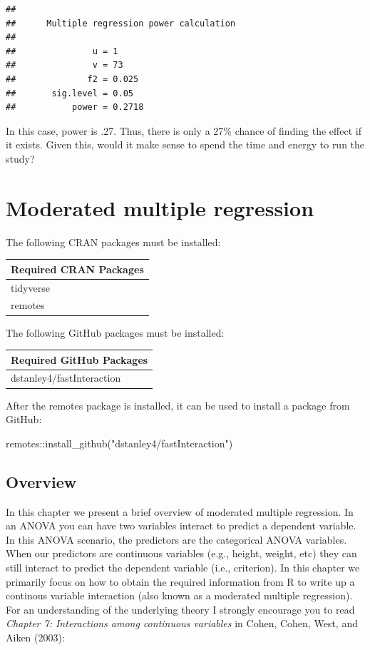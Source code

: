 \documentclass[
]{krantz}
\makeatletter
\newenvironment{Shaded}{\begin{snugshade}}{\end{snugshade}}
\newcommand{\FunctionTok}[1]{\textcolor[rgb]{0,0,0}{#1}}
\newcommand{\NormalTok}[1]{#1}
\newcommand{\SpecialCharTok}[1]{\textcolor[rgb]{0,0,0}{#1}}
\newcommand{\StringTok}[1]{\textcolor[rgb]{0.5,0.5,0.5}{#1}}
\newenvironment{kframe}{%
\medskip{}
\setlength{\fboxsep}{.8em}
 \def\at@end@of@kframe{}%
 \ifinner\ifhmode%
  \def\at@end@of@kframe{\end{minipage}}%
  \begin{minipage}{\columnwidth}%
 \fi\fi%
 \def\FrameCommand##1{\hskip\@totalleftmargin \hskip-\fboxsep
 \colorbox{shadecolor}{##1}\hskip-\fboxsep
     \hskip-\linewidth \hskip-\@totalleftmargin \hskip\columnwidth}%
 \MakeFramed {\advance\hsize-\width
   \@totalleftmargin\z@ \linewidth\hsize
   \@setminipage}}%
 {\par\unskip\endMakeFramed%
 \at@end@of@kframe}
\renewenvironment{Shaded}{\begin{kframe}}{\end{kframe}}
\makeatother
\begin{document}
\begin{verbatim}
## 
##      Multiple regression power calculation 
## 
##               u = 1
##               v = 73
##              f2 = 0.025
##       sig.level = 0.05
##           power = 0.2718
\end{verbatim}

In this case, power is .27. Thus, there is only a 27\% chance of finding the effect if it exists. Given this, would it make sense to spend the time and energy to run the study?

\hypertarget{moderated-multiple-regression}{%
\chapter{Moderated multiple regression}\label{moderated-multiple-regression}}

The following CRAN packages must be installed:

\begin{longtable}[]{@{}l@{}}
\toprule
Required CRAN Packages \\
\midrule
\endhead
tidyverse \\
remotes \\
\bottomrule
\end{longtable}

The following GitHub packages must be installed:

\begin{longtable}[]{@{}l@{}}
\toprule
Required GitHub Packages \\
\midrule
\endhead
dstanley4/fastInteraction \\
\bottomrule
\end{longtable}

After the remotes package is installed, it can be used to install a package from GitHub:

\begin{Shaded}
\begin{Highlighting}[]
\NormalTok{remotes}\SpecialCharTok{::}\FunctionTok{install\_github}\NormalTok{(}\StringTok{"dstanley4/fastInteraction"}\NormalTok{)}
\end{Highlighting}
\end{Shaded}

\hypertarget{overview-7}{%
\section{Overview}\label{overview-7}}

In this chapter we present a brief overview of moderated multiple regression. In an ANOVA you can have two variables interact to predict a dependent variable. In this ANOVA scenario, the predictors are the categorical ANOVA variables. When our predictors are continuous variables (e.g., height, weight, etc) they can still interact to predict the dependent variable (i.e., criterion). In this chapter we primarily focus on how to obtain the required information from R to write up a continous variable interaction (also known as a moderated multiple regression). For an understanding of the underlying theory I strongly encourage you to read \emph{Chapter 7: Interactions among continuous variables} in Cohen, Cohen, West, and Aiken (2003):
\end{document}
